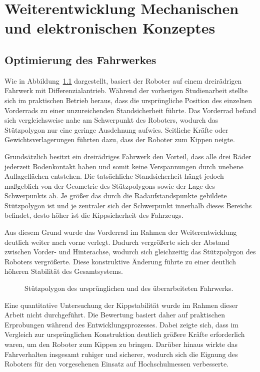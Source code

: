 \chapter{Weiterentwicklung Mechanischen und elektronischen Konzeptes}
\label{cha:Vorgehensweise}


\label{sec:Konzeptentwicklung}

\section{Optimierung des Fahrwerkes}

Wie in Abbildung~\ref{fig:fahrwerk} dargestellt, basiert der Roboter auf einem dreirädrigen Fahrwerk mit Differenzialantrieb. Während der vorherigen Studienarbeit stellte sich im praktischen Betrieb heraus, dass die ursprüngliche Position des einzelnen Vorderrads zu einer unzureichenden Standsicherheit führte. Das Vorderrad befand sich vergleichsweise nahe am Schwerpunkt des Roboters, wodurch das Stützpolygon nur eine geringe Ausdehnung aufwies. Seitliche Kräfte oder Gewichtsverlagerungen führten dazu, dass der Roboter zum Kippen neigte.

Grundsätzlich besitzt ein dreirädriges Fahrwerk den Vorteil, dass alle drei Räder jederzeit Bodenkontakt haben und somit keine Verspannungen durch unebene Auflageflächen entstehen. Die tatsächliche Standsicherheit hängt jedoch maßgeblich von der Geometrie des Stützpolygons sowie der Lage des Schwerpunkts ab. Je größer das durch die Radaufstandspunkte gebildete Stützpolygon ist und je zentraler sich der Schwerpunkt innerhalb dieses Bereichs befindet, desto höher ist die Kippsicherheit des Fahrzeugs.

Aus diesem Grund wurde das Vorderrad im Rahmen der Weiterentwicklung deutlich weiter nach vorne verlegt. Dadurch vergrößerte sich der Abstand zwischen Vorder- und Hinterachse, wodurch sich gleichzeitig das Stützpolygon des Roboters vergrößerte. Diese konstruktive Änderung führte zu einer deutlich höheren Stabilität des Gesamtsystems.

\begin{figure}[htbp]
	\centering
	
	\caption{Stützpolygon des ursprünglichen und des überarbeiteten Fahrwerks.}
	\label{fig:fahrwerk}
\end{figure}

Eine quantitative Untersuchung der Kippstabilität wurde im Rahmen dieser Arbeit nicht durchgeführt. Die Bewertung basiert daher auf praktischen Erprobungen während des Entwicklungsprozesses. Dabei zeigte sich, dass im Vergleich zur ursprünglichen Konstruktion deutlich größere Kräfte erforderlich waren, um den Roboter zum Kippen zu bringen. Darüber hinaus wirkte das Fahrverhalten insgesamt ruhiger und sicherer, wodurch sich die Eignung des Roboters für den vorgesehenen Einsatz auf Hochschulmessen verbesserte.




